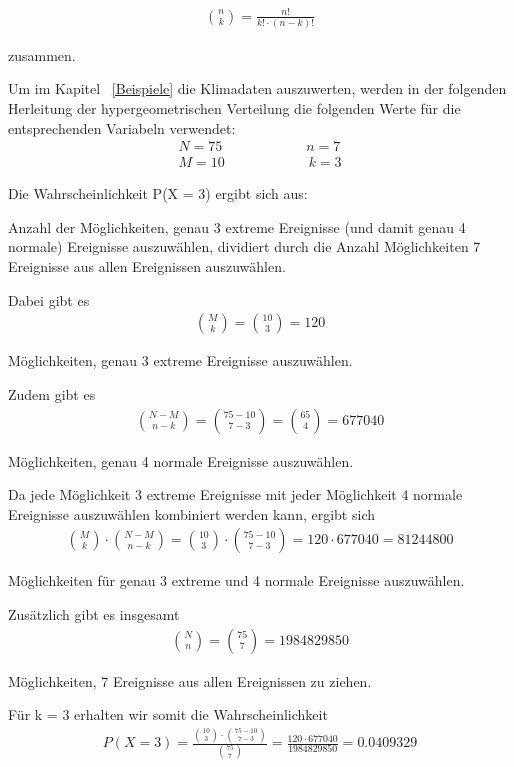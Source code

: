 \begin{refsection}
\begin{align*}
\binom{n}{k} = \frac {n!}{k! \cdot (n-k)!} 
\end{align*}

zusammen.

Um im Kapitel ~\ref{Beispiele}  die Klimadaten auszuwerten, werden in der folgenden Herleitung der hypergeometrischen Verteilung die folgenden Werte für die entsprechenden Variabeln verwendet:
\begin{align*}
N = 75 \quad \quad \quad \quad \quad \quad 
n = 7 \\
M = 10 \quad \quad \quad \quad \quad \quad 
k = 3
\end{align*}

Die Wahrscheinlichkeit P(X = 3) ergibt sich aus:

Anzahl der Möglichkeiten, genau 3 extreme Ereignisse (und damit genau 4 normale) Ereignisse auszuwählen, dividiert durch die Anzahl Möglichkeiten 7 Ereignisse aus allen Ereignissen auszuwählen.
 
Dabei gibt es
\begin{align*}
\binom{M}{k} = \binom{10}{3} = 120
\end{align*}

Möglichkeiten, genau 3 extreme Ereignisse auszuwählen.

Zudem gibt es 
\begin{align*}
\binom{N-M}{n-k} = \binom{75-10}{7-3} = \binom{65}{4} = 677040
\end{align*}

Möglichkeiten, genau 4 normale Ereignisse auszuwählen.

Da jede Möglichkeit 3 extreme Ereignisse mit jeder Möglichkeit 4 normale Ereignisse auszuwählen kombiniert werden kann, ergibt sich
\begin{align*}
\binom{M}{k} \cdot \binom{N-M}{n-k} = \binom{10}{3} \cdot \binom{75-10}{7-3} = 120 
\cdot 677040 = 81244800
\end{align*}

Möglichkeiten für genau 3 extreme und 4 normale Ereignisse auszuwählen.


Zusätzlich gibt es insgesamt
\begin{align*}
\binom{N}{n} = \binom{75}{7} = 1984829850
\end{align*}

Möglichkeiten, 7 Ereignisse aus allen Ereignissen zu ziehen.


Für k = 3 erhalten wir somit die Wahrscheinlichkeit
\begin{align*}
P(X = 3) = \frac{ \binom{10}{3} \cdot \binom{75-10}{7-3}}{ \binom{75}{7} } = \frac{ 120 \cdot 677040}{ 1984829850 } = 0.0409329
\end{align*}


\end{refsection}
